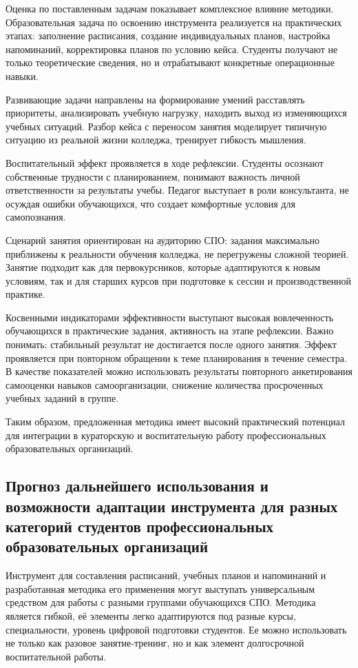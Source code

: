\documentclass[14pt,a4paper]{article}
\begin{document}
Оценка по поставленным задачам показывает комплексное влияние методики. Образовательная задача по освоению инструмента реализуется на практических этапах: заполнение расписания, создание индивидуальных планов, настройка напоминаний, корректировка планов по условию кейса. Студенты получают не только теоретические сведения, но и отрабатывают конкретные операционные навыки.

Развивающие задачи направлены на формирование умений расставлять приоритеты, анализировать учебную нагрузку, находить выход из изменяющихся учебных ситуаций. Разбор кейса с переносом занятия моделирует типичную ситуацию из реальной жизни колледжа, тренирует гибкость мышления.

Воспитательный эффект проявляется в ходе рефлексии. Студенты осознают собственные трудности с планированием, понимают важность личной ответственности за результаты учебы. Педагог выступает в роли консультанта, не осуждая ошибки обучающихся, что создает комфортные условия для самопознания.

Сценарий занятия ориентирован на аудиторию СПО: задания максимально приближены к реальности обучения колледжа, не перегружены сложной теорией. Занятие подходит как для первокурсников, которые адаптируются к новым условиям, так и для старших курсов при подготовке к сессии и производственной практике.

Косвенными индикаторами эффективности выступают высокая вовлеченность обучающихся в практические задания, активность на этапе рефлексии. Важно понимать: стабильный результат не достигается после одного занятия. Эффект проявляется при повторном обращении к теме планирования в течение семестра. В качестве показателей можно использовать результаты повторного анкетирования самооценки навыков самоорганизации, снижение количества просроченных учебных заданий в группе.

Таким образом, предложенная методика имеет высокий практический потенциал для интеграции в кураторскую и воспитательную работу профессиональных образовательных организаций.


\subsection{Прогноз дальнейшего использования и возможности адаптации инструмента для разных категорий студентов профессиональных образовательных организаций}

Инструмент для составления расписаний, учебных планов и напоминаний и разработанная методика его применения могут выступать универсальным средством для работы с разными группами обучающихся СПО. Методика является гибкой, её элементы легко адаптируются под разные курсы, специальности, уровень цифровой подготовки студентов. Ее можно использовать не только как разовое занятие‑тренинг, но и как элемент долгосрочной воспитательной работы.
\end{document}
